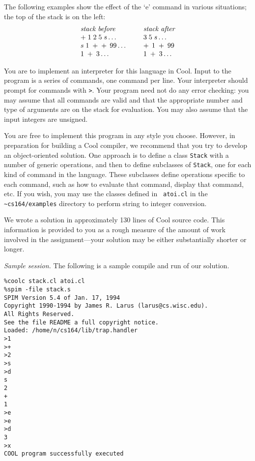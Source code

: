 The following examples show the effect of the `e' command in various
situations; the top of the stack is on the left:
\[
\begin{array}{lcl}
\mbox{\em stack before} & & \mbox{\em stack after} \\
+ \; 1 \; 2 \; 5 \; s \ldots & \;\; & 3 \; 5 \; s \ldots \\
s \; 1 \; + \; + \,\; 99 \ldots & & + \,\; 1\; + \; 99 \\
1 \; + \; 3 \ldots & & 1 \; + \; 3 \ldots \\
\end{array}
\]

You are to implement an interpreter for this language in Cool.  Input
to the program is a series of commands, one command per line.  Your
interpreter should prompt for commands with {\tt >}.  Your program
need not do any error checking: you may assume that all commands are
valid and that the appropriate number and type of arguments are on the
stack for evaluation. You may also assume that the input integers are
unsigned.

You are free to implement this program in any style you choose.
However, in preparation for building a Cool compiler, we recommend that
you try to develop an object-oriented solution.  One approach is to
define a class {\tt Stack} with a number of generic operations, and
then to define subclasses of {\tt Stack}, one for each kind of command
in the language.  These subclasses define operations specific to each
command, such as how to evaluate that command, display that command, etc.
If you wish, you may use the classes defined in {\tt
atoi.cl} in the {\tt \~{ }cs164/examples} directory to perform string
to integer conversion.

We wrote a solution in approximately 130 lines of Cool source code.
This information is provided to you as a rough measure of the amount
of work involved in the assignment---your solution may be either
substantially shorter or longer.

{\em Sample session.} The following is a sample compile and run of our solution.
\begin{verbatim}
%coolc stack.cl atoi.cl
%spim -file stack.s
SPIM Version 5.4 of Jan. 17, 1994
Copyright 1990-1994 by James R. Larus (larus@cs.wisc.edu).
All Rights Reserved.
See the file README a full copyright notice.
Loaded: /home/n/cs164/lib/trap.handler
>1
>+
>2
>s
>d
s
2
+
1
>e
>e
>d
3
>x
COOL program successfully executed
\end{verbatim}

